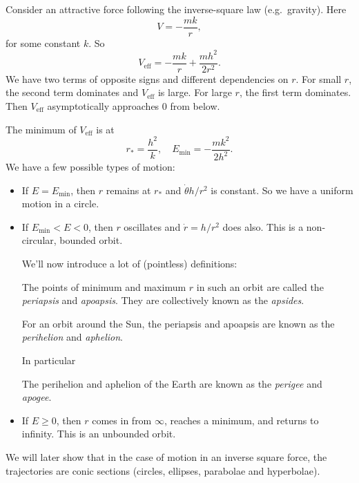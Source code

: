 \documentclass[a4paper]{article}
\begin{document}
\begin{eg}
  Consider an attractive force following the inverse-square law (e.g.\ gravity). Here
  \[
    V = -\frac{mk}{r},
  \]
  for some constant $k$. So
  \[
    V_{\text{eff}} = -\frac{mk}{r} + \frac{mh^2}{2r^2}.
  \]
  We have two terms of opposite signs and different dependencies on $r$. For small $r$, the second term dominates and $V_{\text{eff}}$ is large. For large $r$, the first term dominates. Then $V_{\text{eff}}$ asymptotically approaches $0$ from below.
  \begin{center}
  \end{center}
  The minimum of $V_{\text{eff}}$ is at
  \[
    r_{*} = \frac{h^2}{k},\quad E_{\text{min}} = -\frac{mk^2}{2h^2}.
  \]
  We have a few possible types of motion:
  \begin{itemize}
    \item If $E = E_{\min}$, then $r$ remains at $r_*$ and $\dot{\theta} h/r^2$ is constant. So we have a uniform motion in a circle.
    \item If $E_{\min} < E < 0$, then $r$ oscillates and $\dot{r}=h/r^2$ does also. This is a non-circular, bounded orbit.

      We'll now introduce a lot of (pointless) definitions:

      \begin{defi}
        The points of minimum and maximum $r$ in such an orbit are called the \emph{periapsis} and \emph{apoapsis}. They are collectively known as the \emph{apsides}.
      \end{defi}

      \begin{defi}
        For an orbit around the Sun, the periapsis and apoapsis are known as the \emph{perihelion} and \emph{aphelion}.
      \end{defi}

      In particular
      \begin{defi}
        The perihelion and aphelion of the Earth are known as the \emph{perigee} and \emph{apogee}.
      \end{defi}

    \item If $E \geq 0$, then $r$ comes in from $\infty$, reaches a minimum, and returns to infinity. This is an unbounded orbit.
  \end{itemize}

  We will later show that in the case of motion in an inverse square force, the trajectories are conic sections (circles, ellipses, parabolae and hyperbolae).
\end{eg}
\end{document}
